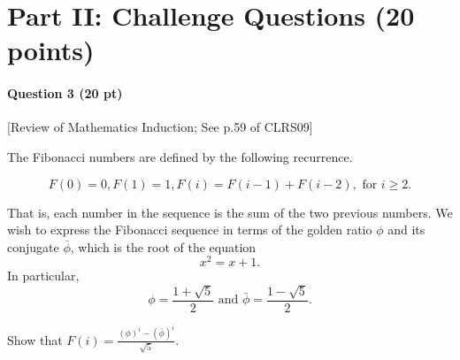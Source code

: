 \documentclass[11pt,letterpaper]{article}
\begin{document}
\pagebreak

\section*{Part II: Challenge Questions (20 points)}

\paragraph*{Question 3 (20 pt)} [Review of Mathematics Induction; See p.59 of CLRS09]

The Fibonacci numbers are defined by the following recurrence.

$$
F(0) = 0, F(1) = 1, F(i) = F(i-1) + F(i-2), \text{ for $i\geq 2$}.
$$

That is, each number in the sequence is the sum of the two previous numbers. 
We wish to express the Fibonacci sequence in terms of the golden ratio $\phi$ and its conjugate $\bar{\phi}$, which is the root of the equation 
$$
x^2 = x+1.
$$
In particular, 
$$
\phi = \frac{1 + \sqrt{5}}{2} \text{ and } \bar{\phi} = \frac{1 - \sqrt{5}}{2}.
$$

Show that $F(i) = \frac{(\phi)^i - (\bar{\phi})^i}{\sqrt{5}}$.

\medskip
\end{document}
